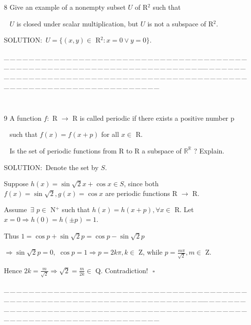 \documentclass[a4paper, 11pt, UTF8]{article}
\begin{document}
\begin{large}
{\timesbf\Large 8} {\timessl\Large 
Give an example of a nonempty subset $U$ of {\timesbf R}$^2$ such that}\par\,\,\,
{\timessl\Large $U$ is closed under scalar multiplication, but $U$ is not a subspace of {\timesbf R}$^2$.
}\par
{\timesbf S\footnotesize{OLUTION:}}\,\,\,$U=\{(x,y)\in$ {\timesbf R}$^2:x=0\vee y=0\}.$\par
{\tiny \_\,\_\,\_\,\_\,\_\,\_\,\_\,\_\,\_\,\_\,\_\,\_\,\_\,\_\,\_\,\_\,\_\,\_\,\_\,\_\,\_\,\_\,\_\,\_\,\_\,\_\,\_\,\_\,\_\,\_\,\_\,\_\,\_\,\_\,\_\,\_\,\_\,\_\,\_\,\_\,\_\,\_\,\_\,\_\,\_\,\_\,\_\,\_\,\_\,\_\,\_\,\_\,\_\,\_\,\_\,\_\,\_\,\_\,\_\,\_\,\_\,\_\,\_\,\_\,\_\,\_\,\_\,\_\,\_\,\_\,\_\_\,\_\,\_\,\_\,\_\,\_\,\_\,\_\,\_\,\_\,\_\,\_\,\_\,\_\,\_\,\_\,\_\,\_\,\_\,\_\,\_\,\_\,\_\,\_\,\_\,\_\,\_\,\_\,\_\,\_\,\_\,\_\,\_\,\_\,\_\,\_\,\_\,\_\,\_\,\_\,\_\,\_\,\_\,\_\,\_\,\_\,\_\,\_\,\_\,\_\,\_\,\_\,\_\,\_\,\_\,\_\,\_\,\_\,\_\,\_\,\_\,\_\,\_\,\_\,\_\,\_\,\_\,\_\,\_\,\_\,\_}{\tiny\,\par}

{\timesbf\Large 9} {\timessl\Large 
A function $f:$ {\timesbf R} $\rightarrow$ {\timesbf R} is called periodic if there exists a positive number p}\par\,\,\,
{\timessl\Large such that $f(x)=f(x+p)$ for all $x\in$ {\timesbf R}.}\par\,\,\,
{\timessl\Large Is the set of periodic functions from {\timesbf R} to {\timesbf R} a subspace of $\mathbb{R}^\mathbb{R}$ ? Explain.}\par
{\timesbf S\footnotesize{OLUTION:}}\,\,\,Denote the set by $S$.\par\quad
Suppose $h(x)=\sin\sqrt{2}x+\cos x\in S$, since both $f(x)=\sin\sqrt{2},g(x)=\cos x$ are periodic functions {\timesbf R} $\rightarrow$ {\timesbf R}.\par\quad
Assume $\,\exists\,\,p\in$ {\timesbf N}$^+$ such that $h(x)=h(x+p),\forall x\in$ {\timesbf R}. Let $x=0\Rightarrow h(0)=h(\pm p)=1$.\par\quad
Thus $1=\cos p+\sin\sqrt{2}p=\cos p-\sin\sqrt{2}p$\par\quad
$\Rightarrow\sin\sqrt{2}p=0,\,\,\cos p=1\Rightarrow p=2k\pi,k\in$ {\timesbf Z}, while $p=\displaystyle\frac{m\pi}{\sqrt{2}},m\in$ {\timesbf Z}.\par\quad
Hence $2k=\displaystyle\frac{m}{\sqrt{2}}\Rightarrow \sqrt{2}=\displaystyle\frac{m}{2k}\in$ {\timesbf Q}. Contradiction!$\,\,\,\,\square$\par
{\tiny \_\,\_\,\_\,\_\,\_\,\_\,\_\,\_\,\_\,\_\,\_\,\_\,\_\,\_\,\_\,\_\,\_\,\_\,\_\,\_\,\_\,\_\,\_\,\_\,\_\,\_\,\_\,\_\,\_\,\_\,\_\,\_\,\_\,\_\,\_\,\_\,\_\,\_\,\_\,\_\,\_\,\_\,\_\,\_\,\_\,\_\,\_\,\_\,\_\,\_\,\_\,\_\,\_\,\_\,\_\,\_\,\_\,\_\,\_\,\_\,\_\,\_\,\_\,\_\,\_\,\_\,\_\,\_\,\_\,\_\,\_\_\,\_\,\_\,\_\,\_\,\_\,\_\,\_\,\_\,\_\,\_\,\_\,\_\,\_\,\_\,\_\,\_\,\_\,\_\,\_\,\_\,\_\,\_\,\_\,\_\,\_\,\_\,\_\,\_\,\_\,\_\,\_\,\_\,\_\,\_\,\_\,\_\,\_\,\_\,\_\,\_\,\_\,\_\,\_\,\_\,\_\,\_\,\_\,\_\,\_\,\_\,\_\,\_\,\_\,\_\,\_\,\_\,\_\,\_\,\_\,\_\,\_\,\_\,\_\,\_\,\_\,\_\,\_\,\_\,\_\,\_}\par{\tiny\,\par}


\end{large}
\end{document}
